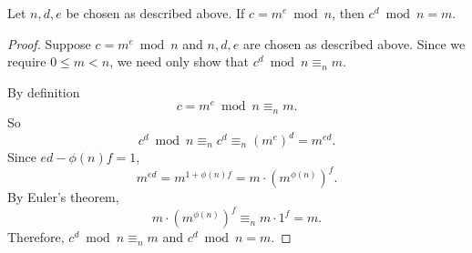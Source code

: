\documentclass[../m055main.tex]{subfiles}
\begin{document}
\begin{theorem}
    Let $n,d,e$ be chosen as described above.
    If $c = m^e \bmod n$, then $c^d \bmod n = m$.
\end{theorem}

\begin{proof}
    Suppose $c = m^e \bmod n$ and $n,d,e$ are chosen as described above.
    Since we require $0 \leq m < n$, we need only show that $c^d \bmod n \equiv_n m$.

    By definition
    \[ c = m^e \bmod n \equiv_n m. \]
    So
    \[ c^d \bmod n \equiv_n c^d \equiv_n \left( m^e \right)^d = m^{ed}. \]
    Since $ed - \phi (n) f = 1$,
    \[ m^{ed} = m^{1 + \phi(n) f} = m \cdot \left( m^{\phi (n)} \right)^f. \]
    By Euler's theorem,
    \[ m \cdot \left( m^{\phi (n)} \right)^f \equiv_n m \cdot 1^f = m. \]
    Therefore, $c^d \bmod n \equiv_n m$ and $c^d \bmod n = m$.
\end{proof}
\end{document}
